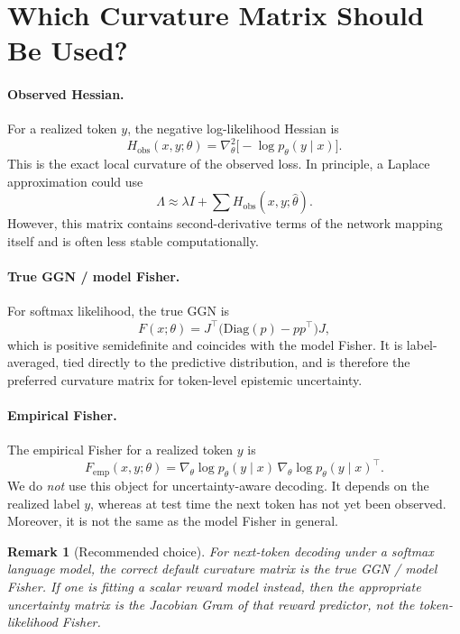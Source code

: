 \documentclass[11pt]{article}
\newtheorem{remark}{Remark}
\begin{document}
\section{Which Curvature Matrix Should Be Used?}

\paragraph{Observed Hessian.}
For a realized token $y$, the negative log-likelihood Hessian is
\[
H_{\mathrm{obs}}(x,y;\theta)
=
\nabla_\theta^2\bigl[-\log p_\theta(y\mid x)\bigr].
\]
This is the exact local curvature of the observed loss.
In principle, a Laplace approximation could use
\[
\Lambda \approx \lambda I + \sum H_{\mathrm{obs}}(x,y;\hat\theta).
\]
However, this matrix contains second-derivative terms of the network
mapping itself and is often less stable computationally.

\paragraph{True GGN / model Fisher.}
For softmax likelihood, the true GGN is
\[
F(x;\theta)
=
J^\top\bigl(\mathrm{Diag}(p)-pp^\top\bigr)J,
\]
which is positive semidefinite and coincides with the model Fisher.
It is label-averaged, tied directly to the predictive distribution,
and is therefore the preferred curvature matrix for token-level
epistemic uncertainty.

\paragraph{Empirical Fisher.}
The empirical Fisher for a realized token $y$ is
\[
F_{\mathrm{emp}}(x,y;\theta)
=
\nabla_\theta \log p_\theta(y\mid x)\,
\nabla_\theta \log p_\theta(y\mid x)^\top.
\]
We do \emph{not} use this object for uncertainty-aware decoding.
It depends on the realized label $y$, whereas at test time the next token
has not yet been observed.
Moreover, it is not the same as the model Fisher in general.

\begin{remark}[Recommended choice]
For next-token decoding under a softmax language model, the correct
default curvature matrix is the true GGN / model Fisher.
If one is fitting a scalar reward model instead, then the appropriate
uncertainty matrix is the Jacobian Gram of that reward predictor, not the
token-likelihood Fisher.
\end{remark}
\end{document}
